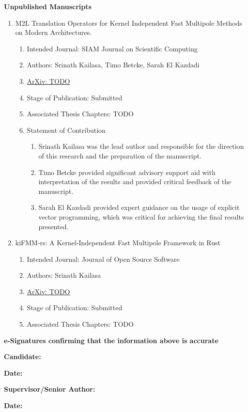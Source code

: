 \textbf{Unpublished Manuscripts}

\begin{enumerate}
    \item M2L Translation Operators for Kernel Independent Fast Multipole Methods on Modern Architectures.
    \begin{enumerate}[label=\alph*)]
      \item Intended Journal: SIAM Journal on Scientific Computing
      \item Authors: Srinath Kailasa, Timo Betcke, Sarah El Kazdadi
      \item  \href{https://doi.org/10.48550/arXiv.2303.08394}{ArXiv: TODO}
      \item Stage of Publication: Submitted
      \item Associated Thesis Chapters: TODO
      \item Statement of Contribution
      \begin{enumerate}
        \item Srinath Kailasa was the lead author and responsible for the direction of this research and the preparation of the manuscript.
        \item Timo Betcke provided significant advisory support aid with interpretation of the results and provided critical feedback of the manuscript.
        \item Sarah El Kazdadi provided expert guidance on the usage of explicit vector programming, which was critical for achieving the final results presented.
      \end{enumerate}
    \end{enumerate}

    \item kiFMM-rs: A Kernel-Independent Fast Multipole Framework in Rust
    \begin{enumerate}[label=\alph*)]
      \item Intended Journal: Journal of Open Source Software
      \item Authors: Srinath Kailasa
      \item  \href{https://doi.org/10.48550/arXiv.2303.08394}{ArXiv: TODO}
      \item Stage of Publication: Submitted
      \item Associated Thesis Chapters: TODO
    \end{enumerate}

\end{enumerate}

\textbf{e-Signatures confirming that the information above is accurate}

\hspace*{10mm}

\textbf{Candidate:}

\textbf{Date:}

\hspace*{10mm}

\textbf{Supervisor/Senior Author:}

\textbf{Date:}